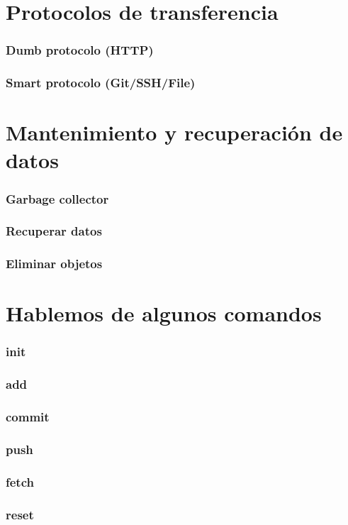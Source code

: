 \documentclass[10pt]{beamer}
\begin{document}
  \section*{Protocolos de transferencia}

  \begin{frame}
    \frametitle{Dumb protocolo (HTTP)}
  \end{frame}

  \begin{frame}
    \frametitle{Smart protocolo (Git/SSH/File)}
  \end{frame}

  \section*{Mantenimiento y recuperación de datos}

  \begin{frame}
    \frametitle{Garbage collector}
  \end{frame}

  \begin{frame}
    \frametitle{Recuperar datos}
  \end{frame}

  \begin{frame}
    \frametitle{Eliminar objetos}
  \end{frame}

  \section*{Hablemos de algunos comandos}

  \begin{frame}
    \frametitle{init}
  \end{frame}

  \begin{frame}
    \frametitle{add}
  \end{frame}

  \begin{frame}
    \frametitle{commit}
  \end{frame}

  \begin{frame}
    \frametitle{push}
  \end{frame}

  \begin{frame}
    \frametitle{fetch}
  \end{frame}

  \begin{frame}
    \frametitle{reset}
  \end{frame}
\end{document}

